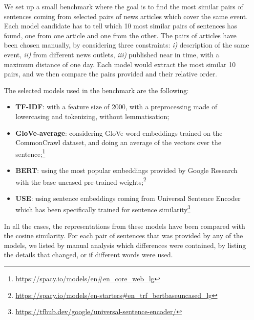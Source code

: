 We set up a small benchmark where the goal is to find the most similar pairs of sentences coming from selected pairs of news articles which cover the same event. Each model candidate has to tell which 10 most similar pairs of sentences has found, one from one article and one from the other.
The pairs of articles have been chosen manually, by considering three constraints: \textit{i)} description of the same event, \textit{ii)} from different news outlets, \textit{iii)} published near in time, with a maximum distance of one day.
Each model would extract the most similar 10 pairs, and we then compare the pairs provided and their relative order.

The selected models used in the benchmark are the following:
\begin{itemize}
    \item \textbf{TF-IDF}: with a feature size of 2000, with a preprocessing made of lowercasing and tokenizing, without lemmatisation;
    \item \textbf{GloVe-average}: considering GloVe word embeddings trained on the CommonCrawl dataset, and doing an average of the vectors over the sentence;\footnote{\url{https://spacy.io/models/en\#en_core_web_lg}}
    \item \textbf{BERT}: using the most popular embeddings provided by Google Research~\cite{devlin2018bert} with the base uncased pre-trained weights;\footnote{\url{https://spacy.io/models/en-starters\#en_trf_bertbaseuncased_lg}}
    \item \textbf{USE}: using sentence embeddings coming from Universal Sentence Encoder~\cite{cer2018universal} which has been specifically trained for sentence similarity\footnote{\url{https://tfhub.dev/google/universal-sentence-encoder/}}
\end{itemize}

In all the cases, the representations from these models have been compared with the cosine similarity.
For each pair of sentences that was provided by any of the models, we listed by manual analysis which differences were contained, by listing the details that changed, or if different words were used.


